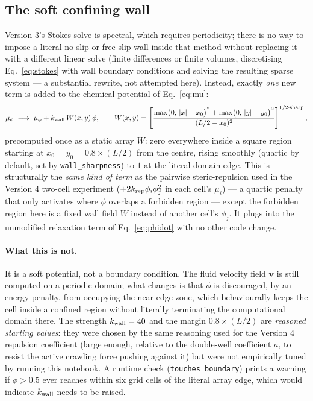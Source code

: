 \documentclass[11pt]{article}
\newcommand{\bv}{\mathbf{v}}
\begin{document}
\subsection{The soft confining wall}
\label{sec:wall}
Version 3's Stokes solve is spectral, which requires periodicity;
there is no way to impose a literal no-slip or free-slip wall inside
that method without replacing it with a different linear solve
(finite differences or finite volumes, discretising
Eq.~\eqref{eq:stokes} with wall boundary conditions and solving the
resulting sparse system — a substantial rewrite, not attempted here).
Instead, exactly \emph{one} new term is added to the chemical
potential of Eq.~\eqref{eq:mu}:
\begin{equation}
\mu_\phi \;\longrightarrow\; \mu_\phi + k_{\rm wall}\,W(x,y)\,\phi,
\qquad
W(x,y) = \left[\frac{\max\!\big(0,\,|x|-x_0\big)^2+\max\!\big(0,\,|y|-y_0\big)^2}{(L/2-x_0)^2}\right]^{1/2\cdot{\rm sharp}},
\label{eq:wall}
\end{equation}
precomputed once as a static array $W$: zero everywhere inside a
square region starting at $x_0=y_0=0.8\times(L/2)$ from the centre,
rising smoothly (quartic by default, set by \texttt{wall\_sharpness})
to $1$ at the literal domain edge. This is structurally the
\emph{same kind of term} as the pairwise steric-repulsion used in the
Version 4 two-cell experiment ($+2k_{\rm rep}\phi_i\phi_j^2$ in each
cell's $\mu_i$) — a quartic penalty that only activates where $\phi$
overlaps a forbidden region — except the forbidden region here is a
fixed wall field $W$ instead of another cell's $\phi_j$. It plugs into
the unmodified relaxation term of Eq.~\eqref{eq:phidot} with no other
code change.

\paragraph{What this is not.} It is a soft potential, not a boundary
condition. The fluid velocity field $\bv$ is still computed on a
periodic domain; what changes is that $\phi$ is discouraged, by an
energy penalty, from occupying the near-edge zone, which behaviourally
keeps the cell inside a confined region without literally terminating
the computational domain there. The strength $k_{\rm wall}=40$ and the
margin $0.8\times(L/2)$ are \emph{reasoned starting values}: they were
chosen by the same reasoning used for the Version 4 repulsion
coefficient (large enough, relative to the double-well coefficient
$a$, to resist the active crawling force pushing against it) but were
not empirically tuned by running this notebook. A runtime check
(\texttt{touches\_boundary}) prints a warning if $\phi>0.5$ ever
reaches within six grid cells of the literal array edge, which would
indicate $k_{\rm wall}$ needs to be raised.
\end{document}
